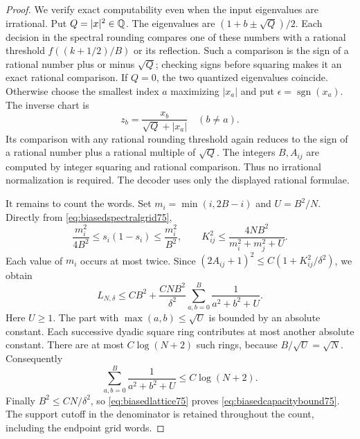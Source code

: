 \begin{proof}
We verify exact computability even when the input eigenvalues are
irrational. Put $Q=|x|^2\in\mathbb Q$. The eigenvalues are
$(1+b\pm\sqrt Q)/2$. Each decision in the spectral rounding compares
one of these numbers with a rational threshold $f((k+1/2)/B)$ or its
reflection. Such a comparison is the sign of a rational number plus
or minus $\sqrt Q$; checking signs before squaring makes it an exact
rational comparison. If $Q=0$, the two quantized eigenvalues coincide.
Otherwise choose the smallest index $a$ maximizing $|x_a|$ and put
$\epsilon=\operatorname{sgn}(x_a)$. The inverse chart is
\[
                    z_b=\frac{x_b}{\sqrt Q+|x_a|}\quad(b\ne a).
\]
Its comparison with any rational rounding threshold again reduces
to the sign of a rational number plus a rational multiple of
$\sqrt Q$. The integers $B,A_{ij}$ are computed by integer squaring
and rational comparison. Thus no irrational normalization is required.
The decoder uses only the displayed rational formulae.

It remains to count the words. Set $m_i=\min(i,2B-i)$ and
$U=B^2/N$. Directly from \eqref{eq:biasedspectralgrid75},
\[
 \frac{m_i^2}{4B^2}\le s_i(1-s_i)\le\frac{m_i^2}{B^2},\qquad
 K_{ij}^2\le
          \frac{4NB^2}{m_i^2+m_j^2+U}.
\]
Each value of $m_i$ occurs at most twice. Since
$(2A_{ij}+1)^2\le C(1+K_{ij}^2/\delta^2)$, we obtain
\begin{equation}\label{eq:biasedlattice75}
 L_{N,\delta}\le CB^2+
 \frac{CNB^2}{\delta^2}
       \sum_{a,b=0}^{B}\frac1{a^2+b^2+U}.
\end{equation}
Here $U\ge1$. The part with $\max(a,b)\le\sqrt U$ is bounded by an
absolute constant. Each successive dyadic square ring contributes
at most another absolute constant. There are at most
$C\log(N+2)$ such rings, because $B/\sqrt U=\sqrt N$. Consequently
\[
              \sum_{a,b=0}^{B}\frac1{a^2+b^2+U}
                       \le C\log(N+2).
\]
Finally $B^2\le CN/\delta^2$, so \eqref{eq:biasedlattice75} proves
\eqref{eq:biasedcapacitybound75}. The support cutoff in the denominator
is retained throughout the count, including the endpoint grid words.
\end{proof}


